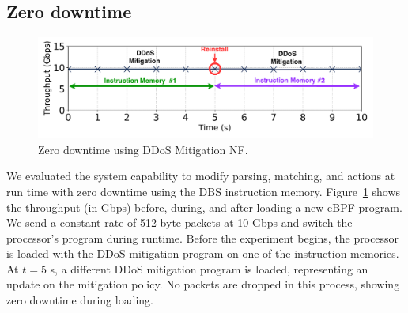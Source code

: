 

\subsection{Zero downtime}
\label{sec:downtime}

\begin{figure}[th]
\centering
\includegraphics[width=1.\linewidth]{figures/zero_downtime.pdf}\caption{Zero downtime using DDoS Mitigation NF.}
\label{fig:zerodowntime}
\end{figure}



We evaluated the system capability to modify parsing, matching, and actions at run time with zero downtime using the DBS instruction memory. Figure~\ref{fig:zerodowntime} shows the throughput (in Gbps) before, during, and after loading a new eBPF program. We send a constant rate of 512-byte packets at 10 Gbps and switch the processor's program during runtime. Before the experiment begins, the processor is loaded with the DDoS mitigation program on one of the instruction memories. At $t=5$ s, a different DDoS mitigation program is loaded, representing an update on the mitigation policy. 
No packets are dropped in this process, showing zero downtime during loading.


